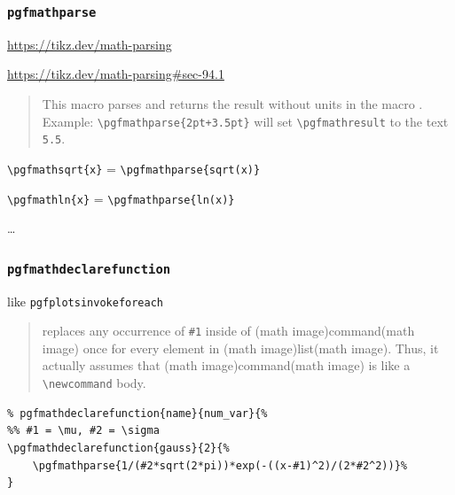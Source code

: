 \documentclass[
]{book}
\theoremstyle{definition}
\theoremstyle{definition}
\theoremstyle{definition}
\theoremstyle{definition}
\theoremstyle{remark}
\begin{document}
\subsubsection{\texorpdfstring{\texttt{pgfmathparse}}{pgfmathparse}}\label{pgfmathparse}

\url{https://tikz.dev/math-parsing}

\url{https://tikz.dev/math-parsing\#sec-94.1}

\begin{quote}
This macro parses and returns the result without units in the macro \pgfmathresult.
Example: \texttt{\textbackslash{}pgfmathparse\{2pt+3.5pt\}} will set \texttt{\textbackslash{}pgfmathresult} to the text \texttt{5.5}.
\end{quote}

\texttt{\textbackslash{}pgfmathsqrt\{x\}} = \texttt{\textbackslash{}pgfmathparse\{sqrt(x)\}}

\texttt{\textbackslash{}pgfmathln\{x\}} = \texttt{\textbackslash{}pgfmathparse\{ln(x)\}}

\ldots{}

\subsubsection{\texorpdfstring{\texttt{pgfmathdeclarefunction}}{pgfmathdeclarefunction}}\label{pgfmathdeclarefunction}

like \texttt{pgfplotsinvokeforeach}

\begin{quote}
replaces any occurrence of \texttt{\#1} inside of (math image)command(math image) once for every element in (math image)list(math image). Thus, it actually assumes that (math image)command(math image) is like a \texttt{\textbackslash{}newcommand} body.
\end{quote}

\begin{verbatim}
% pgfmathdeclarefunction{name}{num_var}{%
%% #1 = \mu, #2 = \sigma
\pgfmathdeclarefunction{gauss}{2}{%
    \pgfmathparse{1/(#2*sqrt(2*pi))*exp(-((x-#1)^2)/(2*#2^2))}%
}
\end{verbatim}
\end{document}
